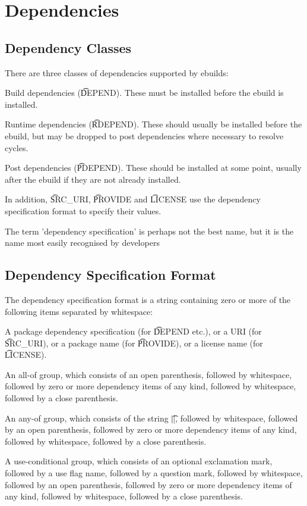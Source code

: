 \chapter{Dependencies}
\label{dependencies}

\section{Dependency Classes}

There are three classes of dependencies supported by ebuilds:

\begin{bulletlist}
\item Build dependencies (\t{DEPEND}). These must be installed before the ebuild is installed.
\item Runtime dependencies (\t{RDEPEND}). These should usually be installed before the ebuild,
    but may be dropped to post dependencies where necessary to resolve cycles.
\item Post dependencies (\t{PDEPEND}). These should be installed at some point, usually after
    the ebuild if they are not already installed.
\end{bulletlist}

In addition, \t{SRC\_URI}, \t{PROVIDE} and \t{LICENSE} use the dependency specification format
to specify their values.

\note The term 'dependency specification' is perhaps not the best name, but it is the name
    most easily recognised by developers

\section{Dependency Specification Format}

The dependency specification format is a string containing zero or more of the following
items separated by whitespace:

\begin{bulletlist}
\item A package dependency specification (for \t{DEPEND} etc.), or a URI (for \t{SRC\_URI}),
    or a package name (for \t{PROVIDE}), or a license name (for \t{LICENSE}).
\item An all-of group, which consists of an open parenthesis, followed by whitespace,
    followed by zero or more dependency items of any kind, followed by whitespace, followed
    by a close parenthesis.
\item An any-of group, which consists of the string \t{||}, followed by whitespace,
    followed by an open parenthesis, followed by zero or more dependency items of any kind,
    followed by whitespace, followed by a close parenthesis.
\item A use-conditional group, which consists of an optional exclamation mark, followed by
    a use flag name, followed by a question mark, followed by whitespace, followed by
    an open parenthesis, followed by zero or more dependency items of any kind, followed by
    whitespace, followed by a close parenthesis.
\end{bulletlist}

